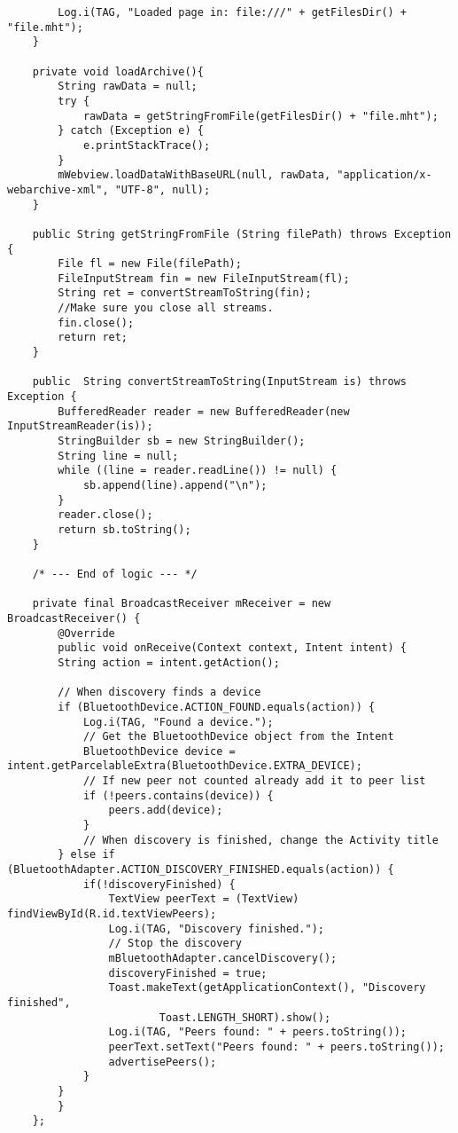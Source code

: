 \begin{verbatim}
        Log.i(TAG, "Loaded page in: file:///" + getFilesDir() + "file.mht");
    }

    private void loadArchive(){
        String rawData = null;
        try {
            rawData = getStringFromFile(getFilesDir() + "file.mht");
        } catch (Exception e) {
            e.printStackTrace();
        }
        mWebview.loadDataWithBaseURL(null, rawData, "application/x-webarchive-xml", "UTF-8", null);
    }

    public String getStringFromFile (String filePath) throws Exception {
        File fl = new File(filePath);
        FileInputStream fin = new FileInputStream(fl);
        String ret = convertStreamToString(fin);
        //Make sure you close all streams.
        fin.close();
        return ret;
    }

    public  String convertStreamToString(InputStream is) throws Exception {
        BufferedReader reader = new BufferedReader(new InputStreamReader(is));
        StringBuilder sb = new StringBuilder();
        String line = null;
        while ((line = reader.readLine()) != null) {
            sb.append(line).append("\n");
        }
        reader.close();
        return sb.toString();
    }

    /* --- End of logic --- */

    private final BroadcastReceiver mReceiver = new BroadcastReceiver() {
        @Override
        public void onReceive(Context context, Intent intent) {
        String action = intent.getAction();

        // When discovery finds a device
        if (BluetoothDevice.ACTION_FOUND.equals(action)) {
            Log.i(TAG, "Found a device.");
            // Get the BluetoothDevice object from the Intent
            BluetoothDevice device = intent.getParcelableExtra(BluetoothDevice.EXTRA_DEVICE);
            // If new peer not counted already add it to peer list
            if (!peers.contains(device)) {
                peers.add(device);
            }
            // When discovery is finished, change the Activity title
        } else if (BluetoothAdapter.ACTION_DISCOVERY_FINISHED.equals(action)) {
            if(!discoveryFinished) {
                TextView peerText = (TextView) findViewById(R.id.textViewPeers);
                Log.i(TAG, "Discovery finished.");
                // Stop the discovery
                mBluetoothAdapter.cancelDiscovery();
                discoveryFinished = true;
                Toast.makeText(getApplicationContext(), "Discovery finished",
                        Toast.LENGTH_SHORT).show();
                Log.i(TAG, "Peers found: " + peers.toString());
                peerText.setText("Peers found: " + peers.toString());
                advertisePeers();
            }
        }
        }
    };


\end{verbatim}
